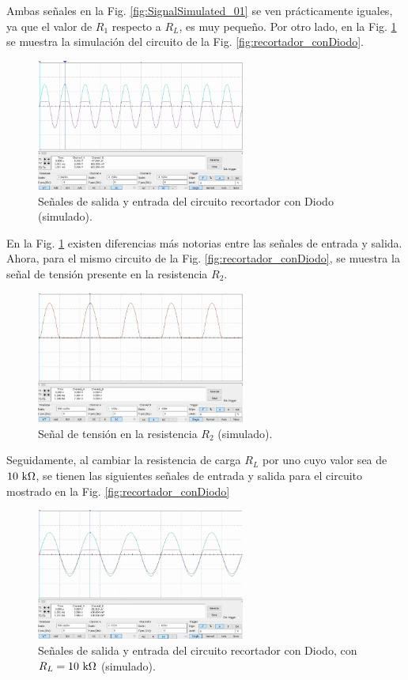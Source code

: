 \documentclass[journal]{IEEEtran}
\begin{document}
Ambas señales en la Fig. \ref{fig:SignalSimulated_01} se ven prácticamente iguales, ya que el valor de $R_1$ respecto a $R_L$, es muy pequeño. Por otro lado, en la Fig. \ref{fig:SignalSimulated_02} se muestra la simulación del circuito de la Fig. \ref{fig:recortador_conDiodo}.
\begin{figure}[H]
        \centering
        \includegraphics[width=2.7in]{SignalSimulated_02.png}
        \caption{Señales de salida y entrada del circuito recortador con Diodo (simulado).}
        \label{fig:SignalSimulated_02}
\end{figure}

En la Fig. \ref{fig:SignalSimulated_02} existen diferencias más notorias entre las señales de entrada y salida. Ahora, para el mismo circuito de la Fig. \ref{fig:recortador_conDiodo}, se muestra la señal de tensión presente en la resistencia $R_2$.

\begin{figure}[htbp]
        \centering
        \includegraphics[width=2.7in]{SignalSimulated_03.png}
        \caption{Señal de tensión en la resistencia $R_2$ (simulado).}
        \label{fig:SignalSimulated_03}
\end{figure}

Seguidamente, al cambiar la resistencia de carga $R_L$ por uno cuyo valor sea de $10~\textnormal{k}\Omega$, se tienen las siguientes señales de entrada y salida para el circuito mostrado en la Fig. \ref{fig:recortador_conDiodo}
\begin{figure}[htbp]
        \centering
        \includegraphics[width=2.7in]{SignalSimulated_04.png}
        \caption{Señales de salida y entrada del circuito recortador con Diodo, con $R_L=10~\textnormal{k}\Omega$ (simulado).}
        \label{fig:SignalSimulated_04}
\end{figure}
\end{document}
